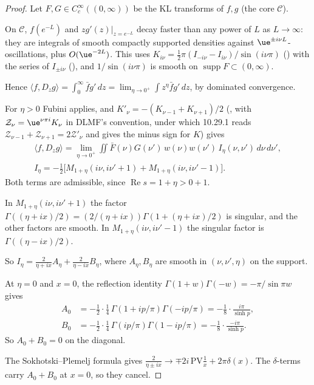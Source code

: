 \begin{proof}
Let $F,G\in C_c^\infty((0,\infty))$ be the KL transforms of $f,g$ (the core $\mathcal C$).

On $\mathcal C$, $f(e^{-L})$ and $zg'(z)|_{z=e^{-L}}$ decay faster than any power of $L$ as $L\to\infty$: they are integrals of smooth compactly supported densities against $\ue^{\pm i\nu L}$-oscillations, plus $O(\ue^{-2L})$. This uses $K_{i\nu}=\tfrac12\pi(I_{-i\nu}-I_{i\nu})/\sin(i\nu\pi)$ (\cite[10.27.4]{DLMF}) with the series of $I_{\pm i\nu}$ (\cite[10.25.2]{DLMF}), and $1/\sin(i\nu\pi)$ is smooth on $\operatorname{supp}F\subset(0,\infty)$.

Hence $\langle f,D_zg\rangle=\int_0^\infty\bar f g'\,dz=\lim_{\eta\to0^+}\int z^\eta\bar fg'\,dz$, by dominated convergence.

For $\eta>0$ Fubini applies, and $K'_\nu=-(K_{\nu-1}+K_{\nu+1})/2$ (\cite[10.29.1]{DLMF}, with $\mathcal Z_\nu=\ue^{\nu\pi i}K_\nu$ in DLMF's convention, under which 10.29.1 reads $\mathcal Z_{\nu-1}+\mathcal Z_{\nu+1}=2\mathcal Z'_\nu$ and gives the minus sign for $K$) gives
\[
\begin{gathered}
\langle f,D_zg\rangle=\lim_{\eta\to0^+}\iint\bar F(\nu)G(\nu')\,w(\nu)w(\nu')\,I_\eta(\nu,\nu')\,d\nu\,d\nu',\\
I_\eta=-\tfrac12\bigl[M_{1+\eta}(i\nu,i\nu'+1)+M_{1+\eta}(i\nu,i\nu'-1)\bigr].
\end{gathered}
\]
Both terms are admissible, since $\operatorname{Re}s=1+\eta>0+1$.

In $M_{1+\eta}(i\nu,i\nu'+1)$ the factor $\Gamma((\eta+ix)/2)=(2/(\eta+ix))\Gamma(1+(\eta+ix)/2)$ is singular, and the other factors are smooth. In $M_{1+\eta}(i\nu,i\nu'-1)$ the singular factor is $\Gamma((\eta-ix)/2)$.

So $I_\eta=\frac{2}{\eta+ix}A_\eta+\frac{2}{\eta-ix}B_\eta$, where $A_\eta,B_\eta$ are smooth in $(\nu,\nu',\eta)$ on the support.

At $\eta=0$ and $x=0$, the reflection identity $\Gamma(1+w)\Gamma(-w)=-\pi/\sin\pi w$ gives
\[
\begin{aligned}
A_0&=-\tfrac12\cdot\tfrac14\,\Gamma(1+ip/\pi)\Gamma(-ip/\pi)=-\tfrac18\cdot\tfrac{i\pi}{\sinh p},\\
B_0&=-\tfrac12\cdot\tfrac14\,\Gamma(ip/\pi)\Gamma(1-ip/\pi)=-\tfrac18\cdot\tfrac{-i\pi}{\sinh p}.
\end{aligned}
\]
So $A_0+B_0=0$ on the diagonal.

The Sokhotski--Plemelj formula gives $\frac{2}{\eta\pm ix}\to\mp2i\,\mathrm{PV}\frac1x+2\pi\delta(x)$. The $\delta$-terms carry $A_0+B_0$ at $x=0$, so they cancel.


\end{proof}
